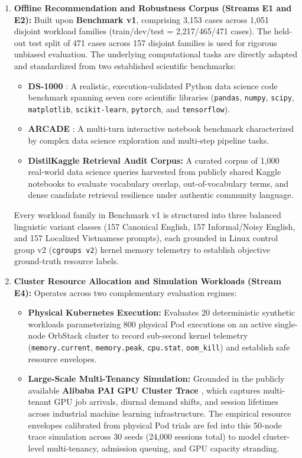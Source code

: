 \begin{enumerate}
    \item \textbf{Offline Recommendation and Robustness Corpus (Streams E1 and E2):} Built upon \textbf{Benchmark v1}, comprising 3,153 cases across 1,051 disjoint workload families (train/dev/test = 2,217/465/471 cases). The held-out test split of 471 cases across 157 disjoint families is used for rigorous unbiased evaluation. The underlying computational tasks are directly adapted and standardized from two established scientific benchmarks:
    \begin{itemize}
        \item \textbf{DS-1000} \cite{ds1000}: A realistic, execution-validated Python data science code benchmark spanning seven core scientific libraries (\texttt{pandas}, \texttt{numpy}, \texttt{scipy}, \texttt{matplotlib}, \texttt{scikit-learn}, \texttt{pytorch}, and \texttt{tensorflow}).
        \item \textbf{ARCADE} \cite{arcade}: A multi-turn interactive notebook benchmark characterized by complex data science exploration and multi-step pipeline tasks.
        \item \textbf{DistilKaggle Retrieval Audit Corpus:} A curated corpus of 1,000 real-world data science queries harvested from publicly shared Kaggle notebooks to evaluate vocabulary overlap, out-of-vocabulary terms, and dense candidate retrieval resilience under authentic community language.
    \end{itemize}
    Every workload family in Benchmark v1 is structured into three balanced linguistic variant classes (157 Canonical English, 157 Informal/Noisy English, and 157 Localized Vietnamese prompts), each grounded in Linux control group v2 (\texttt{cgroups v2}) kernel memory telemetry to establish objective ground-truth resource labels.

    \item \textbf{Cluster Resource Allocation and Simulation Workloads (Stream E4):} Operates across two complementary evaluation regimes:
    \begin{itemize}
        \item \textbf{Physical Kubernetes Execution:} Evaluates 20 deterministic synthetic workloads parameterizing 800 physical Pod executions on an active single-node OrbStack cluster to record sub-second kernel telemetry (\texttt{memory.current}, \texttt{memory.peak}, \texttt{cpu.stat}, \texttt{oom\_kill}) and establish safe resource envelopes.
        \item \textbf{Large-Scale Multi-Tenancy Simulation:} Grounded in the publicly available \textbf{Alibaba PAI GPU Cluster Trace} \cite{alibaba_gpu_trace}, which captures multi-tenant GPU job arrivals, diurnal demand shifts, and session lifetimes across industrial machine learning infrastructure. The empirical resource envelopes calibrated from physical Pod trials are fed into this 50-node trace simulation across 30 seeds (24,000 sessions total) to model cluster-level multi-tenancy, admission queuing, and GPU capacity stranding.
    \end{itemize}


\end{enumerate}
